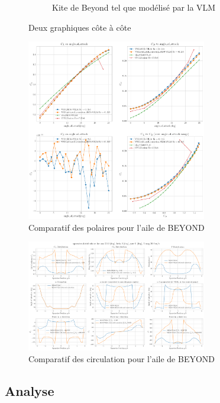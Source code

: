 \documentclass[conference]{IEEEtran}
\begin{document}
\begin{figure}[H]
\begin{subfigure}[b]{0.45\textwidth}
        \caption{Kite de Beyond tel que modélisé par la VLM}
        \label{fig:Kite de Beyond tel que modélisé par la VLM}
    \end{subfigure}
    \caption{Deux graphiques côte à côte}
    \label{fig:deux_graphiques}
\end{figure}

\begin{figure}[H]
    \centering
    \includegraphics[width=0.7\textwidth]{Pics/polar BEYOND.png}
    \caption{Comparatif des polaires pour l'aile de BEYOND}
    \label{fig:Comparatif des polaires pour l'aile de BEYOND}
\end{figure}

\begin{figure}[H]
    \centering
    \includegraphics[width=0.7\textwidth]{Pics/circulation BEYOND.png}
    \caption{Comparatif des circulation pour l'aile de BEYOND}
    \label{fig:Comparatif des circulation pour l'aile de BEYOND}
\end{figure}

\subsection{Analyse} 
\end{document}
